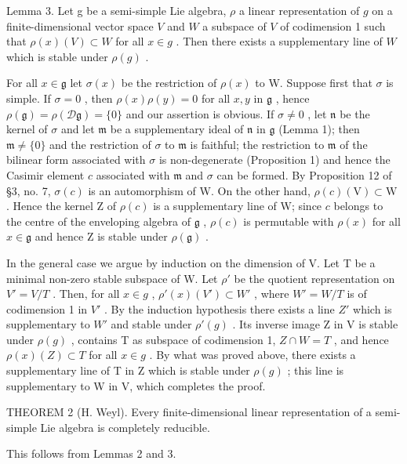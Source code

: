 Lemma 3. Let g be a semi-simple Lie algebra, \(\rho\) a linear representation of \(g\) on a finite-dimensional vector space \(V\) and \(W\) a subspace of \(V\) of codimension 1 such that \(\rho(x)(V) \subset W\) for all \(x \in g\) . Then there exists a supplementary line of \(W\) which is stable under \(\rho(g)\) .

For all \(x \in \mathfrak{g}\) let \(\sigma(x)\) be the restriction of \(\rho(x)\) to W. Suppose first that \(\sigma\) is simple. If \(\sigma = 0\) , then \(\rho(x)\rho(y) = 0\) for all \(x,y\) in \(\mathfrak{g}\) , hence \(\rho(\mathfrak{g}) = \rho(\mathcal{D}\mathfrak{g}) = \{0\}\) and our assertion is obvious. If \(\sigma \neq 0\) , let \(\mathfrak{n}\) be the kernel of \(\sigma\) and let \(\mathfrak{m}\) be a supplementary ideal of \(\mathfrak{n}\) in \(\mathfrak{g}\) (Lemma 1); then \(\mathfrak{m} \neq \{0\}\) and the restriction of \(\sigma\) to \(\mathfrak{m}\) is faithful; the restriction to \(\mathfrak{m}\) of the bilinear form associated with \(\sigma\) is non-degenerate (Proposition 1) and hence the Casimir element \(c\) associated with \(\mathfrak{m}\) and \(\sigma\) can be formed. By Proposition 12 of §3, no. 7, \(\sigma(c)\) is an automorphism of W. On the other hand, \(\rho(c)(\mathrm{V}) \subset \mathrm{W}\) . Hence the kernel Z of \(\rho(c)\) is a supplementary line of W; since \(c\) belongs to the centre of the enveloping algebra of \(\mathfrak{g}\) , \(\rho(c)\) is permutable with \(\rho(x)\) for all \(x \in \mathfrak{g}\) and hence Z is stable under \(\rho(\mathfrak{g})\) .

In the general case we argue by induction on the dimension of V. Let T be a minimal non-zero stable subspace of W. Let \(\rho'\) be the quotient representation on \(V' = V/T\) . Then, for all \(x \in g\) , \(\rho'(x)(V') \subset W'\) , where \(W' = W/T\) is of codimension 1 in \(V'\) . By the induction hypothesis there exists a line \(Z'\) which is supplementary to \(W'\) and stable under \(\rho'(g)\) . Its inverse image Z in V is stable under \(\rho(g)\) , contains T as subspace of codimension 1, \(Z \cap W = T\) , and hence \(\rho(x)(Z) \subset T\) for all \(x \in g\) . By what was proved above, there exists a supplementary line of T in Z which is stable under \(\rho(g)\) ; this line is supplementary to W in V, which completes the proof.

THEOREM 2 (H. Weyl). Every finite-dimensional linear representation of a semi-simple Lie algebra is completely reducible.

This follows from Lemmas 2 and 3.

